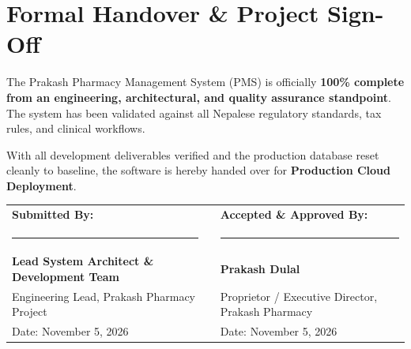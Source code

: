 \documentclass[10pt,a4paper]{article}
\begin{document}
\section{Formal Handover \& Project Sign-Off}

The Prakash Pharmacy Management System (PMS) is officially \textbf{100\% complete from an engineering, architectural, and quality assurance standpoint}. The system has been validated against all Nepalese regulatory standards, tax rules, and clinical workflows.

With all development deliverables verified and the production database reset cleanly to baseline, the software is hereby handed over for \textbf{Production Cloud Deployment}.

\vspace{1.5cm}

\begin{center}
\begin{tabularx}{0.96\textwidth}{p{6.5cm}Xp{6.5cm}}
\textbf{\color{NavyDark}Submitted By:} & & \textbf{\color{NavyDark}Accepted \& Approved By:} \\[1.4cm]
\rule{6.5cm}{0.5pt} & & \rule{6.5cm}{0.5pt} \\
\textbf{Lead System Architect \& Development Team} & & \textbf{Prakash Dulal} \\
Engineering Lead, Prakash Pharmacy Project & & Proprietor / Executive Director, Prakash Pharmacy \\
Date: November 5, 2026 & & Date: November 5, 2026 \\
\end{tabularx}
\end{center}
\end{document}
